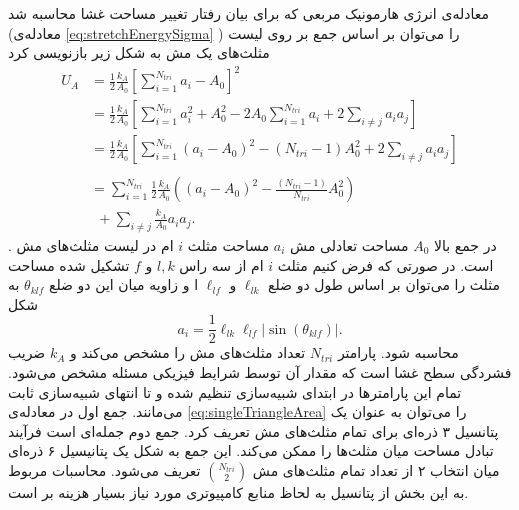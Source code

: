 معادله‌ی انرژی هارمونیک مربعی که برای بیان رفتار تغییر مساحت غشا محاسبه شد (معادله‌ی
\ref{eq:stretchEnergySigma}
) را می‌توان بر اساس جمع بر روی لیست مثلث‌های یک مش به شکل زیر بازنویسی کرد
\begin{equation}
\begin{aligned}
U_{A}&=\frac{1}{2}\frac{k_A}{A_0}\left[\sum_{i=1}^{N_{tri}}a_i-A_0\right]^2\\
&=\frac{1}{2}\frac{k_A}{A_0}\left[\sum_{i=1}^{N_{tri}}a_i^2+A_0^2-2A_0\sum_{i=1}^{N_{tri}}a_i+2\sum_{i\neq j}a_ia_j\right]\\
&=\frac{1}{2}\frac{k_A}{A_0}\left[\sum_{i=1}^{N_{tri}}(a_i-A_0)^2-(N_{tri}-1)A_0^2+2\sum_{i\neq j}a_ia_j\right]\\
&\\
&=\sum_{i=1}^{N_{tri}}\frac{1}{2}\frac{k_A}{A_0}\left((a_i-A_0)^2-\frac{(N_{tri}-1)}{N_{tri}}A_0^2\right)\\
&~~+\sum_{i\neq j}\frac{k_A}{A_0}a_ia_j.
\label{eq:GlobalAreaPotentialExpansion}
\end{aligned}
\end{equation}
. در جمع بالا 
$A_0$
مساحت تعادلی مش
$a_i$
مساحت مثلث
$i$
ام در لیست مثلث‌های مش است. در صورتی که فرض کنیم مثلث
$i$
ام از سه راس 
$l,k$
و
$f$
تشکیل شده مساحت مثلث را می‌توان بر اساس طول دو ضلع
$\ell_{lk}$
و
$\ell_{lf}$
 ا و زاویه‌ میان این دو ضلع
 $\theta_{klf}$
  به شکل 
 \begin{equation}
a_i=\frac{1}{2}\ell_{lk}\ell_{lf}|\sin(\theta_{klf})|.
\label{eq:singleTriangleArea}
\end{equation}
 محاسبه شود. پارامتر 
 $N_{tri}$
تعداد مثلث‌های مش را مشخص می‌کند و 
$k_A$
ضریب فشردگی سطح غشا است که مقدار آن توسط شرایط فیزیکی مسئله مشخص می‌شود. تمام این پارامتر‌ها در ابتدای شبیه‌سازی تنظیم شده و تا انتهای شبیه‌سازی ثابت می‌مانند. جمع اول در معادله‌ی 
 \ref{eq:singleTriangleArea}
 را می‌توان به عنوان یک پتانسیل ۳ ذره‌ای برای تمام مثلث‌های مش تعریف کرد. جمع دوم جمله‌ای است فرآیند تبادل مساحت میان مثلث‌ها را ممکن می‌کند. این جمع به شکل یک پتانیسیل ۶ ذره‌ای میان انتخاب ۲ از تعداد تمام مثلث‌های مش
 ${N_{tri} \choose 2}$
 تعریف می‌شود. محاسبات مربوط به این بخش از پتانسیل به لحاظ منابع کامپیوتری مورد نیاز بسیار هزینه بر است.



